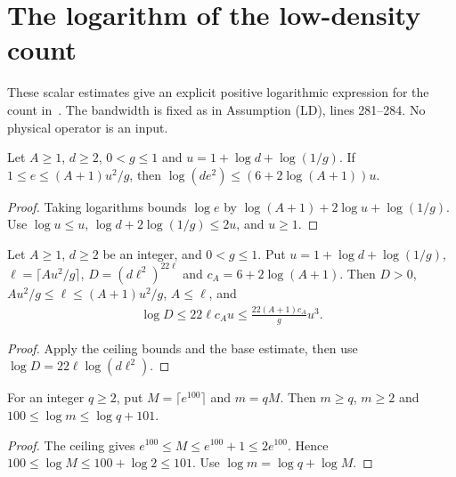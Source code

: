 \section{The logarithm of the low-density count}

These scalar estimates give an explicit positive logarithmic expression
for the count in~\cite[Proposition~prop:albootstrap-ld,
    lines 1107--1128]{Arad2016RigorousRG}. The bandwidth is fixed as in
Assumption (LD), lines 281--284. No physical operator is an input.

\begin{theorem}
    \label{thm:polynomial_filter_log_base}
    \leanok
    Let $A\ge1$, $d\ge2$, $0<g\le1$ and
    $u=1+\log d+\log(1/g)$. If $1\le e\le(A+1)u^2/g$, then
    $\log(de^2)\le(6+2\log(A+1))u$.
\end{theorem}
\begin{proof}\leanok
    Taking logarithms bounds $\log e$ by
    $\log(A+1)+2\log u+\log(1/g)$.
    Use $\log u\le u$, $\log d+2\log(1/g)\le2u$, and $u\ge1$.
\end{proof}

\begin{theorem}
    \label{thm:polynomial_filter_log_count}
    \leanok
    Let $A\ge1$, $d\ge2$ be an integer, and $0<g\le1$. Put
    $u=1+\log d+\log(1/g)$, $\ell=\lceil Au^2/g\rceil$,
    $D=(d\ell^2)^{22\ell}$ and $c_A=6+2\log(A+1)$.
    Then $D>0$,
    $Au^2/g\le\ell\le(A+1)u^2/g$, $A\le\ell$, and
    \begin{align*}
        \log D\le22\ell c_Au
        \le\frac{22(A+1)c_A}{g}u^3.
    \end{align*}
\end{theorem}
\begin{proof}\leanok
    Apply the ceiling bounds and the base estimate, then use
    $\log D=22\ell\log(d\ell^2)$.
\end{proof}

\begin{theorem}
    \label{thm:regularized_filter_count_base}
    \leanok
    For an integer $q\ge2$, put $M=\lceil e^{100}\rceil$ and $m=qM$.
    Then $m\ge q$, $m\ge2$ and
    $100\le\log m\le\log q+101$.
\end{theorem}
\begin{proof}\leanok
    The ceiling gives $e^{100}\le M\le e^{100}+1\le2e^{100}$.
    Hence $100\le\log M\le100+\log2\le101$.
    Use $\log m=\log q+\log M$.
\end{proof}

